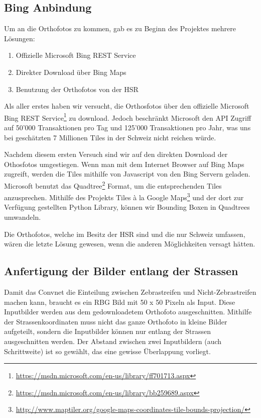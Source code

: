\subsection{Bing Anbindung}
Um an die Orthofotos zu kommen, gab es zu Beginn des Projektes mehrere Lösungen:
\begin{enumerate}
	\item Offizielle Microsoft Bing REST Service
	\item Direkter Download über Bing Maps
	\item Benutzung der Orthofotos von der HSR
\end{enumerate}

Als aller erstes haben wir versucht, die Orthosfotos über den offizielle Microsoft Bing REST Service\footnote{\url{https://msdn.microsoft.com/en-us/library/ff701713.aspx}} zu download. Jedoch beschränkt Microsoft den API Zugriff auf 50'000 Transaktionen pro Tag und 125'000 Transaktionen pro Jahr, was uns bei geschätzten 7 Millionen Tiles in der Schweiz nicht reichen würde.

Nachdem diesem ersten Versuch sind wir auf den direkten Download der Othosfotos umgestiegen. Wenn man mit dem Internet Browser auf Bing Maps zugreift, werden die Tiles mithilfe von Javascript von den Bing Servern geladen. Microsoft benutzt das Quadtree\footnote{\url{https://msdn.microsoft.com/en-us/library/bb259689.aspx}} Format, um die entsprechenden Tiles anzusprechen. Mithilfe des Projekts Tiles à la Google Maps\footnote{\url{http://www.maptiler.org/google-maps-coordinates-tile-bounds-projection/}} und der dort zur Verfügung gestellten Python Library, können wir Bounding Boxen in Quadtrees umwandeln.

Die Orthofotos, welche im Besitz der HSR sind und die nur Schweiz umfassen, wären die letzte Lösung gewesen, wenn die anderen Möglichkeiten versagt hätten.

\subsection{Anfertigung der Bilder entlang der Strassen}
Damit das Convnet die Einteilung zwischen Zebrastreifen und Nicht-Zebrastreifen machen kann, braucht es ein RBG Bild mit 50 x 50 Pixeln als Input. Diese Inputbilder werden aus dem gedownloadetem Orthofoto ausgeschnitten. Mithilfe der Strassenkoordinaten muss nicht das ganze Orthofoto in kleine Bilder aufgeteilt, sondern die Inputbilder können nur entlang der Strassen ausgeschnitten werden. Der Abstand zwischen zwei Inputbildern (auch Schrittweite) ist so gewählt, das eine gewisse Überlappung vorliegt.

